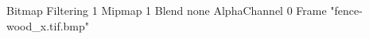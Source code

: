 {Bitmap
	{Filtering 1}
	{Mipmap 1}
	{Blend none}
	{AlphaChannel 0}
	{Frame "fence-wood_x.tif.bmp"}
}
